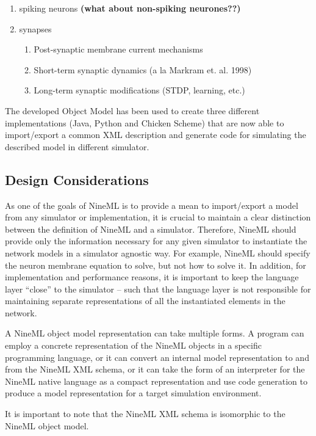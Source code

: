 \documentclass{article}
\begin{document}
\begin{enumerate}
\item spiking neurons \textbf{(what about non-spiking neurones??)}
\item synapses
\begin{enumerate}
\item Post-synaptic membrane current mechanisms
\item Short-term synaptic dynamics (a la Markram et. al. 1998)
\item Long-term synaptic modifications (STDP, learning, etc.)
\end{enumerate}
\end{enumerate}

The developed Object Model has been used to create three different
implementations (Java, Python and Chicken Scheme) that are now able to
import/export a common XML description and generate code for simulating the
described model in different simulator.

\subsection{Design Considerations}

As one of the goals of NineML is to provide a mean to import/export a model from
any simulator or implementation, it is crucial to maintain a clear distinction
between the definition of NineML and a simulator. Therefore, NineML should
provide only the information necessary for any given simulator
to instantiate the network models in a simulator agnostic way.
For example, NineML should specify the neuron membrane equation to solve,
but not how to solve it.  In addition, for implementation and performance
reasons, it is important to keep the language layer ``close'' to the simulator
-- such that the language layer is not responsible for maintaining separate
representations of all the instantiated elements in the network.

A NineML object model representation can take multiple forms.  A
program can employ a concrete representation of the NineML objects in
a specific programming language, or it can convert an internal model
representation to and from the NineML XML schema, or it can take the
form of an interpreter for the NineML native language as a compact
representation and use code generation to produce a model
representation for a target simulation environment.

It is important to note that the NineML XML schema is isomorphic to the NineML
object model.
\end{document}
